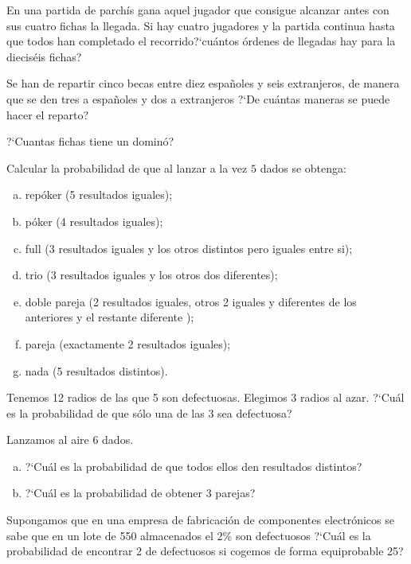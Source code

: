 \documentclass[12pt]{article}
\begin{document}
\probl  En una partida de parchís gana aquel jugador que consigue alcanzar antes  con sus
cuatro fichas la llegada. Si hay  cuatro jugadores y la partida continua hasta que todos
han completado el recorrido?`cuántos   órdenes de llegadas hay para la dieciséis fichas?

\probl  Se han de repartir cinco becas entre diez españoles  y seis extranjeros, de
manera que se den tres a españoles y dos a extranjeros ?`De cuántas maneras se puede hacer
el reparto? 

\probl  ?`Cuantas  fichas tiene un dominó? 




\probl  Calcular la probabilidad de que al lanzar a la vez $5$
dados se obtenga:
\begin{enumerate}[a)]
\item repóker (5 resultados iguales);
\item póker (4 resultados iguales);
\item full (3 resultados iguales y los otros distintos pero iguales entre si);
\item trio (3  resultados iguales y los otros dos  diferentes);
\item doble pareja (2 resultados  iguales, otros 2 iguales y diferentes de los anteriores y el restante diferente
);
\item pareja (exactamente 2 resultados iguales);
\item nada (5 resultados distintos).
\end{enumerate}

\probl  Tenemos 12 radios de las   que  5 son defectuosas. Elegimos  3 radios al azar.
?`Cuál  es la probabilidad de que sólo una de las 3 sea defectuosa? 

\probl  Lanzamos al aire 6 dados.
\begin{enumerate}[a)]
\item ?`Cuál es la probabilidad de que todos ellos den resultados distintos?
\item ?`Cuál es la probabilidad de obtener 3 parejas?
\end{enumerate}

\probl  Supongamos que en una empresa de fabricación de componentes electrónicos se sabe
que en un lote de 550 almacenados el 2\% son   defectuosos ?`Cuál es la probabilidad de
encontrar 2 de defectuosos si cogemos de forma equiprobable 25? 
\end{document}

